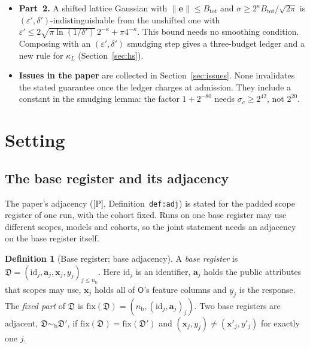 \documentclass[11pt]{article}
\theoremstyle{definition}
\newtheorem{definition}{Definition}[section]
\theoremstyle{plain}
\newcommand{\Op}{\mathsf{O}}
\newcommand{\nrm}[1]{\lVert #1\rVert}
\newcommand{\Btot}{B_{\mathrm{tot}}}
\newcommand{\bx}{\mathbf{x}}
\newcommand{\bD}{\mathfrak D}
\newcommand{\fix}{\mathrm{fix}}
\newcommand{\simb}{\sim_{\mathrm b}}
\newcommand{\Pp}{\textup{[P]}}
\begin{document}
\begin{itemize}[nosep]
  \item \textbf{Part~2.} A shifted lattice Gaussian with $\nrm{\mathbf e}\le\Btot$ and $\sigma\ge2^\kappa\Btot/\sqrt{2\pi}$ is $(\varepsilon',\delta')$-indistinguishable from the unshifted one with $\varepsilon'\le2\sqrt{\pi\ln(1/\delta')}\,2^{-\kappa}+\pi4^{-\kappa}$. This bound needs no smoothing condition. Composing with an $(\varepsilon',\delta')$ smudging step gives a three-budget ledger and a new rule for $\kappa_L$ (Section~\ref{sec:hs}).
  \item \textbf{Issues in the paper} are collected in Section~\ref{sec:issues}. None invalidates the stated guarantee once the ledger charges at admission. They include a constant in the smudging lemma: the factor $1+2^{-80}$ needs $\sigma_c\ge2^{42}$, not $2^{20}$.
\end{itemize}

\tableofcontents

\section{Setting}
\label{sec:setting}

\subsection{The base register and its adjacency}

The paper's adjacency (\Pp, Definition~\texttt{def:adj}) is stated for the padded scope register of one run, with the cohort fixed. Runs on one base register may use different scopes, models and cohorts, so the joint statement needs an adjacency on the base register itself.

\begin{definition}[Base register; base adjacency]\label{def:base}
A \emph{base register} is $\bD=(\mathrm{id}_j,\mathbf a_j,\bx_j,y_j)_{j\le n_{\mathrm b}}$. Here $\mathrm{id}_j$ is an identifier, $\mathbf a_j$ holds the public attributes that scopes may use, $\bx_j$ holds all of $\Op$'s feature columns and $y_j$ is the response. The \emph{fixed part} of $\bD$ is $\fix(\bD)=(n_{\mathrm b},(\mathrm{id}_j,\mathbf a_j)_j)$. Two base registers are adjacent, $\bD\simb\bD'$, if $\fix(\bD)=\fix(\bD')$ and $(\bx_j,y_j)\ne(\bx'_j,y'_j)$ for exactly one $j$.
\end{definition}
\end{document}
